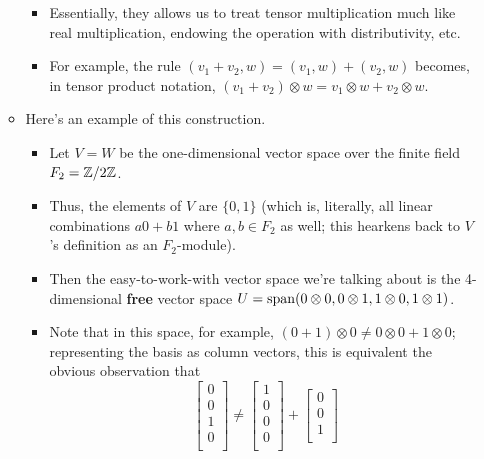 \documentclass[../notes.tex]{subfiles}
\begin{document}
\begin{itemize}
\begin{itemize}
\begin{itemize}
            \item Essentially, they allows us to treat tensor multiplication much like real multiplication, endowing the operation with distributivity, etc.
            \item For example, the rule $(v_1+v_2,w)=(v_1,w)+(v_2,w)$ becomes, in tensor product notation, $(v_1+v_2)\otimes w=v_1\otimes w+v_2\otimes w$.
        \end{itemize}
        \item Here's an example of this construction.
        \begin{itemize}
            \item Let $V=W$ be the one-dimensional vector space over the finite field $F_2=\mathbb{Z}/2\mathbb{Z}$.
            \item Thus, the elements of $V$ are $\{0,1\}$ (which is, literally, all linear combinations $a0+b1$ where $a,b\in F_2$ as well; this hearkens back to $V$'s definition as an $F_2$-module).
            \item Then the easy-to-work-with vector space we're talking about is the 4-dimensional \textbf{free} vector space $U=\operatorname{span}(0\otimes 0,0\otimes 1,1\otimes 0,1\otimes 1)$.
            \item Note that in this space, for example, $(0+1)\otimes 0\neq 0\otimes 0+1\otimes 0$; representing the basis as column vectors, this is equivalent the obvious observation that
            \begin{equation*}
                \begin{bmatrix}
                    0\\
                    0\\
                    1\\
                    0\\
                \end{bmatrix}
                \neq
                \begin{bmatrix}
                    1\\
                    0\\
                    0\\
                    0\\
                \end{bmatrix}
                +
                \begin{bmatrix}
                    0\\
                    0\\
                    1\\

\end{bmatrix}
\end{equation*}
\end{itemize}
\end{itemize}
\end{itemize}
\end{document}

